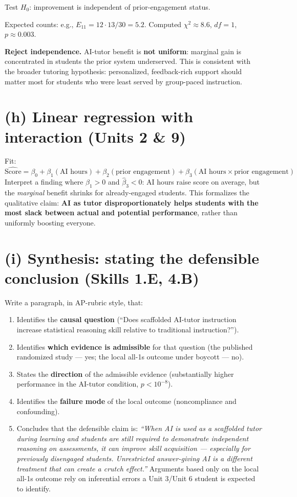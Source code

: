 \documentclass[11pt]{article}
\begin{document}
Test $H_0$: improvement is independent of prior-engagement status.

Expected counts: e.g., $E_{11} = 12 \cdot 13 / 30 = 5.2$.
Computed $\chi^2 \approx 8.6$, $df = 1$, $p \approx 0.003$.

\textbf{Reject independence.} AI-tutor benefit is \textbf{not
uniform}: marginal gain is concentrated in students the prior system
underserved. This is consistent with the broader tutoring hypothesis:
personalized, feedback-rich support should matter most for students
who were least served by group-paced instruction.

\section{(h) Linear regression with interaction \textnormal{\small(Units 2 \& 9)}}

Fit:
\[
\widehat{\text{Score}} = \beta_0 + \beta_1(\text{AI hours})
  + \beta_2(\text{prior engagement})
  + \beta_3(\text{AI hours} \times \text{prior engagement})
\]
Interpret a finding where $\hat\beta_1 > 0$ and $\hat\beta_3 < 0$:
AI hours raise score on average, but the \emph{marginal} benefit
shrinks for already-engaged students. This formalizes the qualitative
claim: \textbf{AI as tutor disproportionately helps students with the
most slack between actual and potential performance}, rather than
uniformly boosting everyone.

\section{(i) Synthesis: stating the defensible conclusion \textnormal{\small(Skills 1.E, 4.B)}}

Write a paragraph, in AP-rubric style, that:
\begin{enumerate}[leftmargin=*]
  \item Identifies the \textbf{causal question} (``Does scaffolded
  AI-tutor instruction increase statistical reasoning skill relative to
  traditional instruction?'').
  \item Identifies \textbf{which evidence is admissible} for that
  question (the published randomized study --- yes; the local all-1s
  outcome under boycott --- no).
  \item States the \textbf{direction} of the admissible evidence
  (substantially higher performance in the AI-tutor condition,
  $p < 10^{-8}$).
  \item Identifies the \textbf{failure mode} of the local outcome
  (noncompliance and confounding).
  \item Concludes that the defensible claim is: \emph{``When AI is
  used as a scaffolded tutor during learning and students are still
  required to demonstrate independent reasoning on assessments, it can
  improve skill acquisition --- especially for previously disengaged
  students. Unrestricted answer-giving AI is a different treatment
  that can create a crutch effect.''} Arguments based only on the
  local all-1s outcome rely on inferential errors a Unit 3/Unit 6
  student is expected to identify.
\end{enumerate}
\end{document}
